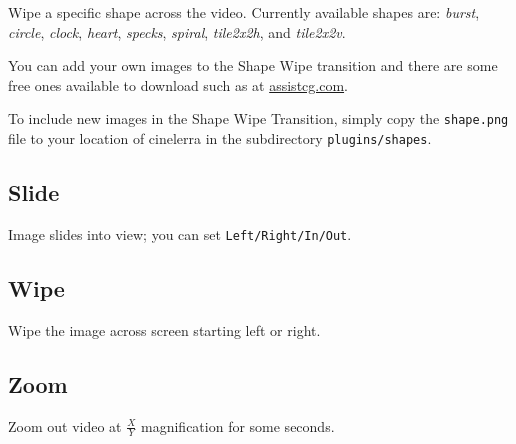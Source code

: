 Wipe a specific shape across the video. Currently available shapes are: \textit{burst}, \textit{circle}, \textit{clock}, \textit{heart}, \textit{specks}, \textit{spiral}, \textit{tile2x2h}, and \textit{tile2x2v}. 

You can add your own images to the Shape Wipe transition and there are some free ones available to download such as at \url{assistcg.com}.

To include new images in the Shape Wipe Transition, simply copy the \texttt{{shape}.png} file to your location of cinelerra in the subdirectory \texttt{plugins/shapes}.

\subsection*{Slide}%
\label{sub:slide}

Image slides into view; you can set \texttt{Left/Right/In/Out}.

\subsection*{Wipe}%
\label{sub:wipe}

Wipe the image across screen starting left or right.

\subsection*{Zoom}%
\label{sub:zoom}

Zoom out video at $\frac{X}{Y}$ magnification for some seconds.


